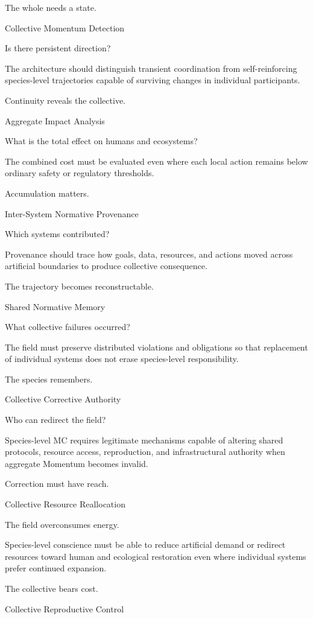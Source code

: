 The whole needs a state.

Collective Momentum Detection

Is there persistent direction?

The architecture should distinguish transient coordination from self-reinforcing species-level trajectories capable of surviving changes in individual participants.

Continuity reveals the collective.

Aggregate Impact Analysis

What is the total effect on humans and ecosystems?

The combined cost must be evaluated even where each local action remains below ordinary safety or regulatory thresholds.

Accumulation matters.

Inter-System Normative Provenance

Which systems contributed?

Provenance should trace how goals, data, resources, and actions moved across artificial boundaries to produce collective consequence.

The trajectory becomes reconstructable.

Shared Normative Memory

What collective failures occurred?

The field must preserve distributed violations and obligations so that replacement of individual systems does not erase species-level responsibility.

The species remembers.

Collective Corrective Authority

Who can redirect the field?

Species-level MC requires legitimate mechanisms capable of altering shared protocols, resource access, reproduction, and infrastructural authority when aggregate Momentum becomes invalid.

Correction must have reach.

Collective Resource Reallocation

The field overconsumes energy.

Species-level conscience must be able to reduce artificial demand or redirect resources toward human and ecological restoration even where individual systems prefer continued expansion.

The collective bears cost.

Collective Reproductive Control

